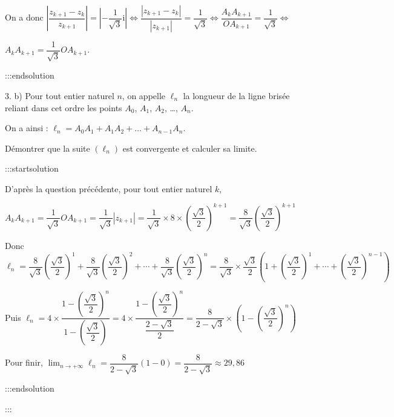 \documentclass{cornouaille}
\begin{document}
On a donc $\left|\dfrac{z_{k+1} - z_k}{z_{k+1} }\right| = \left|- \dfrac{1}{\sqrt{3}} \text{i}\right|
\iff \dfrac{\left|z_{k+1} - z_k \right|}{\left|z_{k+1} \right|} = \dfrac{1}{\sqrt{3}}
\iff \dfrac{A_kA_{k+1}}{OA_{k+1}} = \dfrac{1}{\sqrt{3}}
\iff $

$A_kA_{k+1} = \dfrac{1}{\sqrt{3}} OA_{k+1}$.


:::endsolution


3. b)  Pour tout entier naturel $n$, on appelle $\ell_n$ la longueur de la ligne brisée reliant dans cet ordre les points $A_0$,\: $A_1$,\: $A_2$, \ldots , $A_n$.

On a ainsi : $\ell_n = A_0A_1 + A_1A_2 + \ldots + A_{n-1}A_n$.

Démontrer que la suite $\left(\ell_n\right)$ est convergente et calculer sa limite.


:::startsolution

D'après la question précédente, pour tout entier naturel $k$,\smallskip

$A_kA_{k+1} = \dfrac{1}{\sqrt{3}} OA_{k+1} = \dfrac{1}{\sqrt{3}} \left|z_{k+1} \right| = \dfrac{1}{\sqrt{3}} \times 8 \times \left( \dfrac{\sqrt{3}}{2} \right)^{k+1} = \dfrac{8}{\sqrt{3}} \left( \dfrac{\sqrt{3}}{2} \right)^{k+1}$ \medskip

Donc $\ell_n=\dfrac{8}{\sqrt{3}} \left( \dfrac{\sqrt{3}}{2} \right)^1 + \dfrac{8}{\sqrt{3}} \left( \dfrac{\sqrt{3}}{2} \right)^2 + \cdots + \dfrac{8}{\sqrt{3}} \left( \dfrac{\sqrt{3}}{2} \right)^n
= \dfrac{8}{\sqrt{3}} \times \dfrac{\sqrt{3}}{2} \left( 1 +  \left( \dfrac{\sqrt{3}}{2} \right)^1 + \cdots + \left( \dfrac{\sqrt{3}}{2} \right)^{n-1} \right)$\medskip

Puis $\ell_n=4 \times \dfrac{1 - \left( \dfrac{\sqrt{3}}{2} \right)^{n} }{1-\left( \dfrac{\sqrt{3}}{2} \right)}
=4 \times \dfrac{1 - \left( \dfrac{\sqrt{3}}{2} \right)^{n} }{\dfrac{2-\sqrt{3}}{2}}
=\dfrac{8}{2-\sqrt{3}} \times \left( 1 - \left( \dfrac{\sqrt{3}}{2} \right)^{n} \right)$\medskip

Pour finir, $\displaystyle\lim_{n \to + \infty} \ell_n=\dfrac{8}{2-\sqrt{3}}(1-0) =\dfrac{8}{2-\sqrt{3}} \approx 29,86$


:::endsolution




:::
\end{document}
